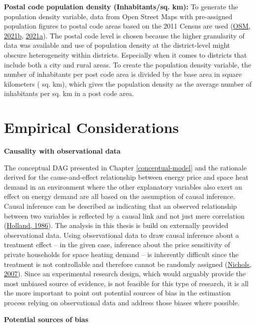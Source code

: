 \documentclass[12pt,twoside]{reedthesis}
\begin{document}
\textbf{Postal code population density (Inhabitants/sq. km):} To generate the population density variable, data from Open Street Maps with pre-assigned population figures to postal code areas based on the 2011 Census are used (\protect\hyperlink{ref-osm21}{OSM, 2021b}, \protect\hyperlink{ref-osm21a}{2021a}). The postal code level is chosen because the higher granularity of data was available and use of population density at the district-level might obscure heterogeneity within districts. Especially when it comes to districts that include both a city and rural areas. To create the population density variable, the number of inhabitants per post code area is divided by the base area in square kilometers ( sq. km), which gives the population density as the average number of inhabitants per sq. km in a post code area.

\hypertarget{empirical-considerations}{%
\section{Empirical Considerations}\label{empirical-considerations}}

\textbf{Causality with observational data}

The conceptual DAG presented in Chapter \ref{conceptual-model} and the rationale derived for the cause-and-effect relationship between energy price and space heat demand in an environment where the other explanatory variables also exert an effect on energy demand are all based on the assumption of causal inference. Causal inference can be described as indicating that an observed relationship between two variables is reflected by a causal link and not just mere correlation (\protect\hyperlink{ref-holland86}{Holland, 1986}). The analysis in this thesis is build on externally provided observational data. Using observational data to draw causal inference about a treatment effect -- in the given case, inference about the price sensitivity of private households for space heating demand -- is inherently difficult since the treatment is not controllable and therefore cannot be randomly assigned (\protect\hyperlink{ref-nichols07}{Nichols, 2007}). Since an experimental research design, which would arguably provide the most unbiased source of evidence, is not feasible for this type of research, it is all the more important to point out potential sources of bias in the estimation process relying on observational data and address those biases where possible.

\textbf{Potential sources of bias}
\end{document}
